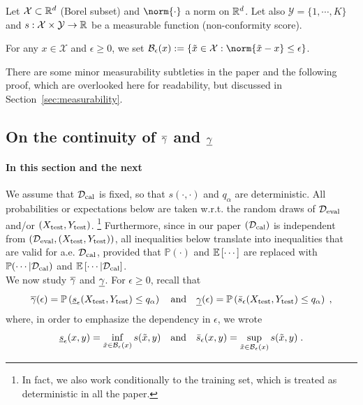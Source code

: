 Let $\mathcal{X}\subset\mathbb{R}^d$ (Borel subset) and $\norm{\cdot}$ a norm on $\mathbb{R}^d$. Let also $\mathcal{Y}=\{1,\cdots,K\}$ and $s:\mathcal{X}\times\mathcal{Y}\rightarrow\mathbb{R}$ be a measurable function (non-conformity score).

For any $x\in\mathcal{X}$ and $\epsilon \geq 0$, we set $\bouleps(x):=\left\{ \tilde{x} \in \mathcal{X} : \norm{\tilde{x} - x} \leq \epsilon\right\}$.

There are some minor measurability subtleties in the paper and the following proof, which are overlooked here for readability, but discussed in Section~\ref{sec:measurability}.

\subsection{On the continuity of $\overline{\gamma}$ and $\underline{\gamma}$}
\label{subsec:continuity}

\paragraph{In this section and the next}
We assume that $\mathcal{D}_\mathrm{cal}$ is fixed, so that $s(\cdot, \cdot)$ and $q_\alpha$ are deterministic. All probabilities or expectations below are taken w.r.t. the random draws of $\mathcal{D}_\mathrm{eval}$ and/or $(X_\mathrm{test}, Y_\mathrm{test})$. \footnote{In fact, we also work conditionally to the training set, which is treated as deterministic in all the paper.} Furthermore, since in our paper $(\mathcal{D}_\mathrm{cal})$ is independent from $(\mathcal{D}_\mathrm{eval},(X_\mathrm{test}, Y_\mathrm{test}))$, all inequalities below translate into inequalities that are valid for a.e. $\mathcal{D}_\mathrm{cal}$, provided that $\mathbb{P}(\cdot)$ and $\mathbb{E}\left[\cdots\right]$ are replaced with $\mathbb{P}(\cdots | \mathcal{D}_\mathrm{cal})$ and $\mathbb{E}\left[\cdots | \mathcal{D}_\mathrm{cal}\right]$.\\

We now study $\overline{\gamma}$ and $\underline{\gamma}$. For $\epsilon\geq 0$, recall that 
$$
\overline{\gamma}(\epsilon) = \mathbb{P}\left(\underline{s}_{\epsilon}(X_\mathrm{test}, Y_\mathrm{test})\leq q_\alpha\right)\quad \textrm{and} \quad \underline{\gamma}(\epsilon)=\mathbb{P}\left(\Bar{s}_{\epsilon}(X_\mathrm{test}, Y_\mathrm{test})\leq q_\alpha\right) \;,
$$
where, in order to emphasize the dependency in $\epsilon$, we wrote
\[
\underline{s}_{\epsilon}(x,y)=\inf\limits_{\tilde{x}\in\mathcal{B}_\epsilon(x)} s(\tilde{x},y) \quad \textrm{and} \quad  \Bar{s}_{\epsilon}(x,y) = \sup\limits_{\tilde{x}\in\mathcal{B}_\epsilon(x)} s(\tilde{x},y) \;.
\]

